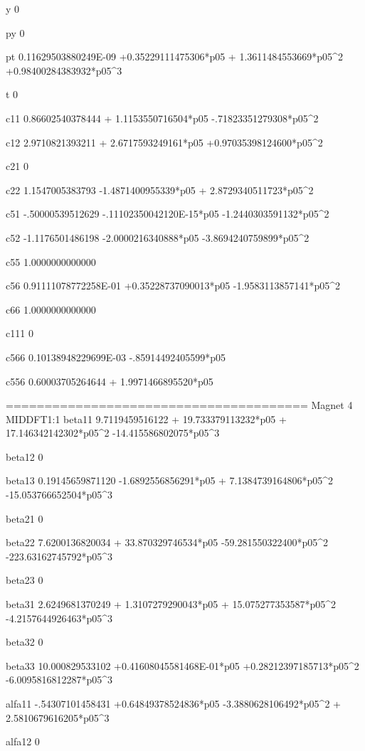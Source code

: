  y      
 0 
  
 py     
 0 
  
 pt     
  0.11629503880249E-09 +0.35229111475306*p05 + 1.3611484553669*p05^2 +0.98400284383932*p05^3 
  
 t      
 0 
  
 c11
  0.86602540378444 + 1.1153550716504*p05  -.71823351279308*p05^2 
  
 c12
   2.9710821393211 + 2.6717593249161*p05 +0.97035398124600*p05^2 
  
 c21
 0 
  
 c22
   1.1547005383793  -1.4871400955339*p05 + 2.8729340511723*p05^2 
  
 c51
  -.50000539512629  -.11102350042120E-15*p05  -1.2440303591132*p05^2 
  
 c52
  -1.1176501486198  -2.0000216340888*p05  -3.8694240759899*p05^2 
  
 c55
   1.0000000000000 
  
 c56
  0.91111078772258E-01 +0.35228737090013*p05  -1.9583113857141*p05^2 
  
 c66
   1.0000000000000 
  
 c111
 0 
  
 c566
  0.10138948229699E-03  -.85914492405599*p05 
  
 c556
  0.60003705264644 + 1.9971466895520*p05 
  
 =======================================
 Magnet            4  MIDDFT1:1       
 beta11 
   9.7119459516122 + 19.733379113232*p05 + 17.146342142302*p05^2  -14.415586802075*p05^3 
  
 beta12 
 0 
  
 beta13 
  0.19145659871120  -1.6892556856291*p05 + 7.1384739164806*p05^2  -15.053766652504*p05^3 
  
 beta21 
 0 
  
 beta22 
   7.6200136820034 + 33.870329746534*p05  -59.281550322400*p05^2  -223.63162745792*p05^3 
  
 beta23 
 0 
  
 beta31 
   2.6249681370249 + 1.3107279290043*p05 + 15.075277353587*p05^2  -4.2157644926463*p05^3 
  
 beta32 
 0 
  
 beta33 
   10.000829533102 +0.41608045581468E-01*p05 +0.28212397185713*p05^2  -6.0095816812287*p05^3 
  
 alfa11 
  -.54307101458431 +0.64849378524836*p05  -3.3880628106492*p05^2 + 2.5810679616205*p05^3 
  
 alfa12 
 0 
  
